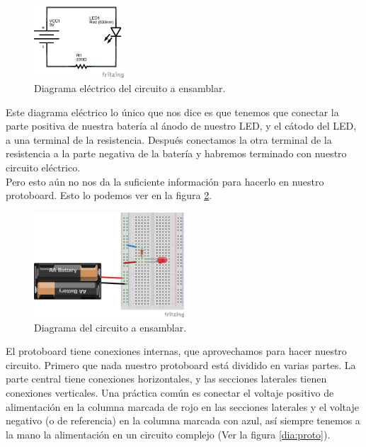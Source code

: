     \begin{figure}[h]
    	\begin{center}
    		\includegraphics[width=0.3\textwidth]{images/LED-bateria-diagrama.png}
    		\caption{Diagrama eléctrico del circuito a ensamblar.}
    		\label{dia:elecir}
    	\end{center}
    \end{figure}

    Este diagrama eléctrico lo único que nos dice es que tenemos que conectar la parte positiva de nuestra batería al ánodo de nuestro LED, y el cátodo del LED, a una terminal de la resistencia. Después conectamos la otra terminal de la resistencia a la parte negativa de la batería y habremos terminado con nuestro circuito eléctrico. \\

    Pero esto aún no nos da la suficiente información para hacerlo en nuestro protoboard. Esto lo podemos ver en la figura \ref{dia:cir}. \\

    \begin{figure}[h]
    	\begin{center}
    		\includegraphics[width=0.5\textwidth]{images/LED-bateria.png}
    		\caption{Diagrama del circuito a ensamblar.}
    		\label{dia:cir}
    	\end{center}
    \end{figure}

    El protoboard tiene conexiones internas, que aprovechamos para hacer nuestro circuito. Primero que nada nuestro protoboard está dividido en varias partes. La parte central tiene conexiones horizontales, y las secciones laterales tienen conexiones verticales. Una práctica común es conectar el voltaje positivo de alimentación en la columna marcada de rojo en las secciones laterales y el voltaje negativo (o de referencia) en la columna marcada con azul, así siempre tenemos a la mano la alimentación en un circuito complejo (Ver la figura \ref{dia:proto}). \\

